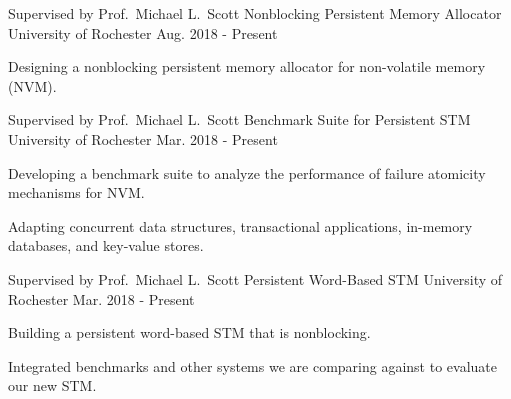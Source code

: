 

\begin{cventries}

  \cventry
    {Supervised by Prof.\ Michael L.\ Scott} %
    {Nonblocking Persistent Memory Allocator} %
    {University of Rochester} %
    {Aug. 2018 - Present} %
    {
      \begin{cvitems} %
        \item {Designing a nonblocking persistent memory allocator for non-volatile memory (NVM).}
      \end{cvitems}
	}

  \cventry
    {Supervised by Prof.\ Michael L.\ Scott} %
    {Benchmark Suite for Persistent STM} %
    {University of Rochester} %
    {Mar. 2018 - Present} %
    {
      \begin{cvitems} %
        \item {Developing a benchmark suite to analyze the performance of failure atomicity mechanisms for NVM.}
        \item {Adapting concurrent data structures, transactional applications, in-memory databases, and key-value stores.}
      \end{cvitems}
    }

  \cventry
    {Supervised by Prof.\ Michael L.\ Scott} %
    {Persistent Word-Based STM} %
    {University of Rochester} %
    {Mar. 2018 - Present} %
    {
      \begin{cvitems} %
        \item {Building a persistent word-based STM that is nonblocking.}
        \item {Integrated benchmarks and other systems we are comparing against to evaluate our new STM.}
      \end{cvitems}
    }


\end{cventries}
